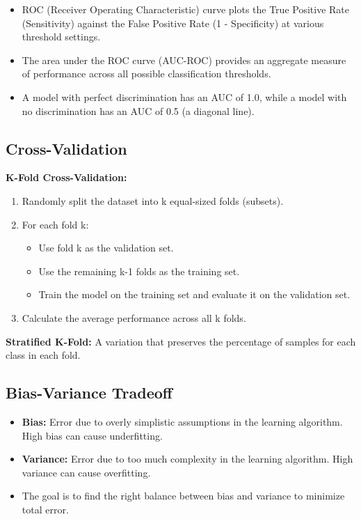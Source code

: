 \begin{itemize}
    \item ROC (Receiver Operating Characteristic) curve plots the True Positive Rate (Sensitivity) against the False Positive Rate (1 - Specificity) at various threshold settings.
    \item The area under the ROC curve (AUC-ROC) provides an aggregate measure of performance across all possible classification thresholds.
    \item A model with perfect discrimination has an AUC of 1.0, while a model with no discrimination has an AUC of 0.5 (a diagonal line).
\end{itemize}

\subsection*{Cross-Validation}

\textbf{K-Fold Cross-Validation:}
\begin{enumerate}
    \item Randomly split the dataset into k equal-sized folds (subsets).
    \item For each fold k:
    \begin{itemize}
        \item Use fold k as the validation set.
        \item Use the remaining k-1 folds as the training set.
        \item Train the model on the training set and evaluate it on the validation set.
    \end{itemize}
    \item Calculate the average performance across all k folds.
\end{enumerate}

\textbf{Stratified K-Fold:} A variation that preserves the percentage of samples for each class in each fold.

\subsection*{Bias-Variance Tradeoff}

\begin{itemize}
    \item \textbf{Bias:} Error due to overly simplistic assumptions in the learning algorithm. High bias can cause underfitting.
    \item \textbf{Variance:} Error due to too much complexity in the learning algorithm. High variance can cause overfitting.
    \item The goal is to find the right balance between bias and variance to minimize total error.
\end{itemize}


